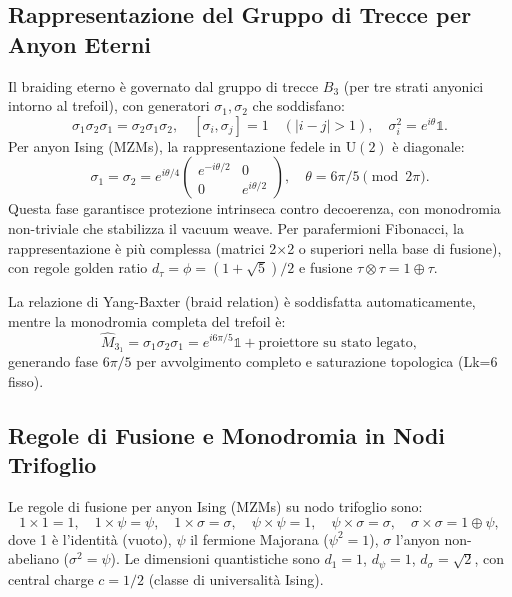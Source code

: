 \documentclass[11pt,a4paper]{article}
\theoremstyle{plain}
\theoremstyle{definition}
\begin{document}
\vspace{0.8cm}

\subsection{Rappresentazione del Gruppo di Trecce per Anyon Eterni}

Il braiding eterno è governato dal gruppo di trecce $B_3$ (per tre strati anyonici intorno al trefoil), con generatori $\sigma_1, \sigma_2$ che soddisfano:
\begin{equation}
\sigma_1 \sigma_2 \sigma_1 = \sigma_2 \sigma_1 \sigma_2, \quad [\sigma_i, \sigma_j] = 1 \quad (|i-j| > 1), \quad \sigma_i^2 = e^{i\theta} \mathbb{1}.
\end{equation}
Per anyon Ising (MZMs), la rappresentazione fedele in $\mathrm{U}(2)$ è diagonale:
\begin{equation}
\sigma_1 = \sigma_2 = e^{i \theta / 4} \begin{pmatrix}
e^{-i \theta / 2} & 0 \\
0 & e^{i \theta / 2}
\end{pmatrix}, \quad \theta = 6\pi/5 \pmod{2\pi}.
\end{equation}
Questa fase garantisce protezione intrinseca contro decoerenza, con monodromia non-triviale che stabilizza il vacuum weave. Per parafermioni Fibonacci, la rappresentazione è più complessa (matrici 2×2 o superiori nella base di fusione), con regole golden ratio $d_\tau = \phi = (1 + \sqrt{5})/2$ e fusione $\tau \otimes \tau = 1 \oplus \tau$.

La relazione di Yang-Baxter (braid relation) è soddisfatta automaticamente, mentre la monodromia completa del trefoil è:
\begin{equation}
\hat{M}_{3_1} = \sigma_1 \sigma_2 \sigma_1 = e^{i 6\pi/5} \mathbb{1} + \text{proiettore su stato legato},
\end{equation}
generando fase $6\pi/5$ per avvolgimento completo e saturazione topologica (Lk=6 fisso).



\vspace{0.8cm}



\subsection{Regole di Fusione e Monodromia in Nodi Trifoglio}

Le regole di fusione per anyon Ising (MZMs) su nodo trifoglio sono:
\begin{equation}
1 \times 1 = 1, \quad 1 \times \psi = \psi, \quad 1 \times \sigma = \sigma, \quad \psi \times \psi = 1, \quad \psi \times \sigma = \sigma, \quad \sigma \times \sigma = 1 \oplus \psi,
\end{equation}
dove 1 è l'identità (vuoto), $\psi$ il fermione Majorana ($\psi^2 = 1$), $\sigma$ l'anyon non-abeliano ($\sigma^2 = \psi$). Le dimensioni quantistiche sono $d_1 = 1$, $d_\psi = 1$, $d_\sigma = \sqrt{2}$, con central charge $c = 1/2$ (classe di universalità Ising).
\end{document}
